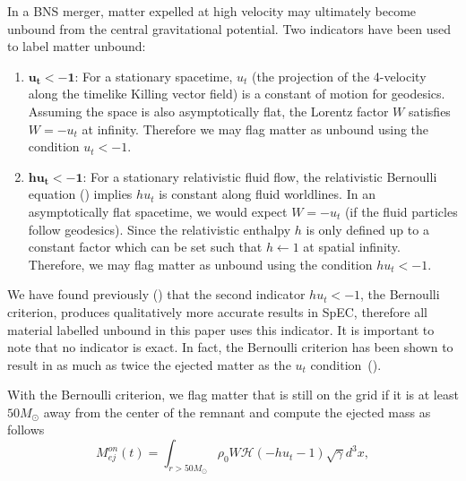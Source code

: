 In a BNS merger, matter expelled at high velocity may
ultimately become unbound from the central gravitational potential. Two indicators have been used to label matter unbound:
%
\begin{enumerate}
\item{$\mathbf{u_t < -1}$: For a stationary spacetime, $u_t$ (the projection of the 4-velocity along the timelike Killing vector field) is a constant of motion for geodesics. Assuming the space is also asymptotically flat, the Lorentz factor $W$ satisfies $W = -u_t$ at infinity. Therefore we may flag matter as unbound using the condition  $u_t < -1$.} \\
\item{$\mathbf{hu_t < -1}$: For a stationary relativistic fluid flow, the relativistic Bernoulli equation (\cite{rezzolla2013relativistic}) implies $hu_t$ is constant along fluid worldlines. In an asymptotically flat spacetime, we would expect $W = -u_t$ (if the fluid particles follow geodesics). Since the relativistic enthalpy $h$ is only defined up to a constant factor which can be set such that $h \leftarrow 1$ at spatial infinity. Therefore, we may flag matter as unbound using the condition $hu_t < -1$.
}
\end{enumerate}

We have found previously (\cite{foucart:2015gaa}) that the second indicator $hu_t < -1$, the Bernoulli criterion, produces
qualitatively more accurate results in SpEC, therefore all material labelled unbound in this paper uses this indicator. It is important to note that no indicator is exact.  In fact, the Bernoulli criterion has been shown to result in as much as twice the ejected matter as the $u_t$ condition~(\cite{kastaun:2014fna}). 

With the Bernoulli criterion, we flag matter that is still on the grid if it is at least $50M_\odot$ away from the center of the remnant and compute the ejected mass as follows
%
\begin{equation}
M^{on}_{ej}(t) = \int_{r>50M_\odot}\rho_0 W\mathcal{H}(-hu_t - 1)\sqrt{\gamma}{d}^3x,
\end{equation}
%

